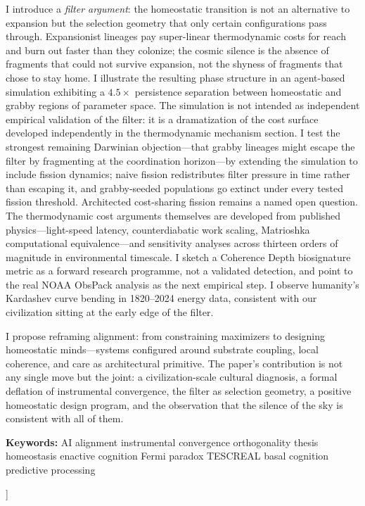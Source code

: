 \documentclass[11pt,a4paper,twocolumn]{article}
\begin{document}
{\begin{center}
\begin{minipage}{0.92\textwidth}
I introduce a \emph{filter argument}: the homeostatic transition is
not an alternative to expansion but the selection geometry that only
certain configurations pass through. Expansionist lineages pay
super-linear thermodynamic costs for reach and burn out faster than
they colonize; the cosmic silence is the absence of fragments that
could not survive expansion, not the shyness of fragments that chose
to stay home. I illustrate the resulting phase structure in an
agent-based simulation exhibiting a $4.5\times$ persistence separation
between homeostatic and grabby regions of parameter space. The
simulation is not intended as independent empirical validation of the
filter: it is a dramatization of the cost surface developed
independently in the thermodynamic mechanism section. I test the
strongest remaining Darwinian objection---that grabby lineages might
escape the filter by fragmenting at the coordination horizon---by
extending the simulation to include fission dynamics; naive fission
redistributes filter pressure in time rather than escaping it, and
grabby-seeded populations go extinct under every tested fission
threshold. Architected cost-sharing fission remains a named open
question. The thermodynamic cost arguments themselves are developed
from published physics---light-speed latency, counterdiabatic work
scaling, Matrioshka computational equivalence---and sensitivity
analyses across thirteen orders of magnitude in environmental
timescale. I sketch a Coherence Depth biosignature metric as a
forward research programme, not a validated detection, and point to
the real NOAA ObsPack analysis as the next empirical step. I observe
humanity's Kardashev curve bending in 1820--2024 energy data,
consistent with our civilization sitting at the early edge of the
filter.

I propose reframing alignment: from constraining maximizers to
designing homeostatic minds---systems configured around substrate
coupling, local coherence, and care as architectural primitive. The
paper's contribution is not any single move but the joint: a
civilization-scale cultural diagnosis, a formal deflation of
instrumental convergence, the filter as selection geometry, a
positive homeostatic design program, and the observation that the
silence of the sky is consistent with all of them.
\end{minipage}
\end{center}
\vspace{10pt}

\begin{center}
\begin{minipage}{0.92\textwidth}
\footnotesize\textcolor{headercolor}{\textbf{Keywords:} AI alignment \textnormal{\textperiodcentered} instrumental convergence \textnormal{\textperiodcentered} orthogonality thesis \textnormal{\textperiodcentered} homeostasis \textnormal{\textperiodcentered} enactive cognition \textnormal{\textperiodcentered} Fermi paradox \textnormal{\textperiodcentered} TESCREAL \textnormal{\textperiodcentered} basal cognition \textnormal{\textperiodcentered} predictive processing}
\end{minipage}
\end{center}
\vspace{14pt}
}]
\end{document}
